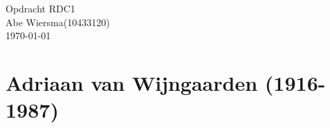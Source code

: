\documentclass[pdftex,12pt,a4paper]{article}
\begin{document}
\noindent Opdracht RDC1\\ 
Abe Wiersma(10433120)\\
\today
\section*{Adriaan van Wijngaarden (1916-1987)}
\end{document}
